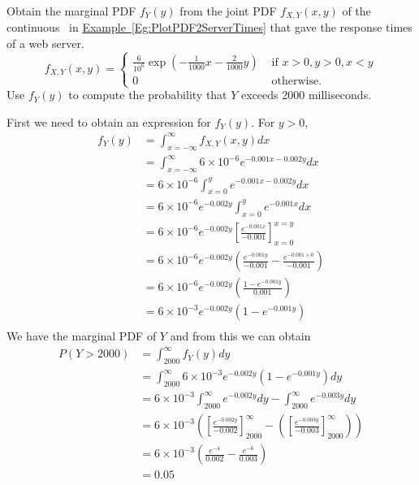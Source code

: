 \begin{example}
Obtain the marginal PDF $f_Y(y)$ from the joint PDF $f_{X,Y}(x,y)$ of the continuous \rv~in \hyperref[Eg:PlotPDF2ServerTimes]{Example~\ref*{Eg:PlotPDF2ServerTimes}} that gave the response times of a web server.
\[
f_{X,Y}(x,y) = 
\begin{cases}
\frac{6}{10^6} \exp \left( -\frac{1}{1000}x-\frac{2}{1000}y \right)
& \text{ if } x>0,y>0,x <y\\
0 & \text{ otherwise}.
\end{cases}
\]
Use $f_Y(y)$ to compute the probability that $Y$ exceeds 2000 milliseconds.

First we need to obtain an expression for $f_Y(y)$. For $y > 0$,
{\scriptsize
\begin{align*}
f_Y(y) 
&= \int_{x=-\infty}^{\infty} f_{X,Y}(x,y) dx\\
&= \int_{x=-\infty}^{\infty} 6 \times 10^{-6} e^{-0.001 x - 0.002y} dx\\
&= 6 \times 10^{-6} \int_{x=0}^{y} e^{-0.001 x - 0.002y} dx\\ 
&= 6 \times 10^{-6} e^{-0.002y} \int_{x=0}^{y}  e^{-0.001 x} dx\\ 
&= 6 \times 10^{-6} e^{-0.002y} \left[ \frac{e^{-0.001 x}}{-0.001}\right]_{x=0}^{x=y}\\ 
&= 6 \times 10^{-6} e^{-0.002y} \left( \frac{e^{-0.001 y}}{-0.001} - \frac{e^{-0.001 \times 0}}{-0.001} \right)\\ 
&= 6 \times 10^{-6} e^{-0.002y} \left( \frac{1- e^{-0.001 y}}{0.001} \right)\\ 
&= 6 \times 10^{-3} e^{-0.002y} \left({1- e^{-0.001 y}} \right)\\ 
\end{align*}
}
We have the marginal PDF of $Y$ and from this we can obtain 
{\scriptsize
\begin{align*}
P(Y>2000)
&= \int_{2000}^{\infty} f_Y(y) dy \\
&= \int_{2000}^{\infty} 6 \times 10^{-3} e^{-0.002y} \left({1- e^{-0.001 y}} \right) dy\\
&= 6 \times 10^{-3} \int_{2000}^{\infty}  e^{-0.002y} dy - \int_{2000}^{\infty} e^{-0.003 y} dy\\
&= 6 \times 10^{-3} \left( \left[ \frac{e^{-0.002y}}{-0.002} \right]_{2000}^{\infty} 
- \left( \left[ \frac{e^{-0.003y}}{-0.003} \right]_{2000}^{\infty} \right) \right)\\
&= 6 \times 10^{-3} \left( \frac{e^{-4}}{0.002} - \frac{e^{-6}}{0.003} \right)\\
&= 0.05
\end{align*}
}


\end{example}

